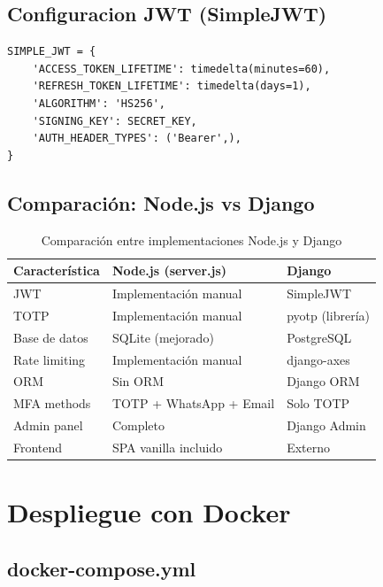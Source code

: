 \documentclass[12pt,a4paper,openany]{article}
\begin{document}
\subsection{Configuracion JWT (SimpleJWT)}

\begin{lstlisting}[style=pythonstyle, caption={Configuración SimpleJWT}]
SIMPLE_JWT = {
    'ACCESS_TOKEN_LIFETIME': timedelta(minutes=60),
    'REFRESH_TOKEN_LIFETIME': timedelta(days=1),
    'ALGORITHM': 'HS256',
    'SIGNING_KEY': SECRET_KEY,
    'AUTH_HEADER_TYPES': ('Bearer',),
}
\end{lstlisting}

\subsection{Comparación: Node.js vs Django}

\begin{table}[H]
\centering
\begin{tabular}{@{}p{3.5cm}p{5cm}p{5cm}@{}}
\toprule
\textbf{Característica} & \textbf{Node.js (server.js)} & \textbf{Django} \\
\midrule
JWT & Implementación manual & SimpleJWT \\
TOTP & Implementación manual & pyotp (librería) \\
Base de datos & SQLite (mejorado) & PostgreSQL \\
Rate limiting & Implementación manual & django-axes \\
ORM & Sin ORM & Django ORM \\
MFA methods & TOTP + WhatsApp + Email & Solo TOTP \\
Admin panel & Completo & Django Admin \\
Frontend & SPA vanilla incluido & Externo \\
\bottomrule
\end{tabular}
\caption{Comparación entre implementaciones Node.js y Django}
\end{table}

\section{Despliegue con Docker}

\subsection{docker-compose.yml}
\end{document}
